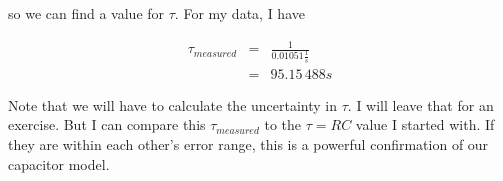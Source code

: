 so we can find a value for $\tau .$ For my data, I have 

\begin{eqnarray*}
	\tau _{measured} &=&\frac{1}{ 0.01051\frac{1}{\unit{s}}} \\
	&=&95.15\,\allowbreak 488\unit{s}
\end{eqnarray*}

Note that we will have to calculate the uncertainty in $\tau .$ I will leave
that for an exercise. But I can compare this $\tau _{measured}$ to the $\tau
=RC$ value I started with. If they are within each other's error range, this
is a powerful confirmation of our capacitor model.


